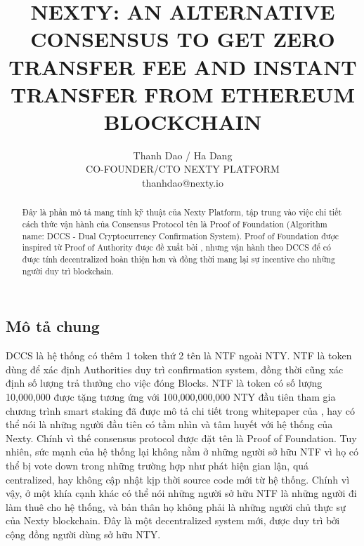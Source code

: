 \documentclass[12pt]{amsart}
\title{NEXTY: AN ALTERNATIVE CONSENSUS TO GET ZERO TRANSFER FEE AND INSTANT TRANSFER FROM ETHEREUM BLOCKCHAIN}
\author{
	Thanh Dao / Ha Dang \\
	CO-FOUNDER/CTO NEXTY PLATFORM \\
	thanhdao@nexty.io
}
\date{} %
\begin{document}
\pagecolor{pagecolor}
\begin{abstract}
Đây là phần mô tả mang tính kỹ thuật của Nexty Platform, tập trung vào việc chi tiết cách thức vận hành của Consensus Protocol tên là Proof of Foundation (Algorithm name: DCCS - Dual Cryptocurrency Confirmation System). Proof of Foundation được inspired từ Proof of Authority được đề xuất bởi \cite{clique}, nhưng vận hành theo DCCS để có được tính decentralized hoàn thiện hơn và đồng thời mang lại sự incentive cho những người duy trì blockchain.
\end{abstract}

\maketitle

\setlength{\columnsep}{20pt}
\begin{multicols}{2}

\section{Mô tả chung}\label{sec:introduction}
DCCS là hệ thống có thêm 1 token thứ 2 tên là NTF ngoài NTY. NTF là token dùng để xác định Authorities duy trì confirmation system, đồng thời cũng xác định số lượng trả thưởng cho việc đóng Blocks. NTF là token có số lượng 10,000,000 được tặng tương ứng với 100,000,000,000 NTY đầu tiên tham gia chương trình smart staking đã được mô tả chi tiết trong whitepaper của \cite{smart-taking}, hay có thể nói là những người đầu tiên có tầm nhìn và tâm huyết với hệ thống của Nexty. Chính vì thế consensus protocol được đặt tên là Proof of Foundation. Tuy nhiên, sức mạnh của hệ thống lại không nằm ở những người sở hữu NTF vì họ có thể bị vote down trong những trường hợp như phát hiện gian lận, quá centralized, hay không cập nhật kịp thời source code mới từ hệ thống. Chính vì vậy, ở một khía cạnh khác có thể nói những người sở hữu NTF là những người đi làm thuê cho hệ thống, và bản thân họ không phải là những người chủ thực sự của Nexty blockchain. Đây là một decentralized system mới, được duy trì bởi cộng đồng người dùng sở hữu NTY.


\end{multicols}
\end{document}
